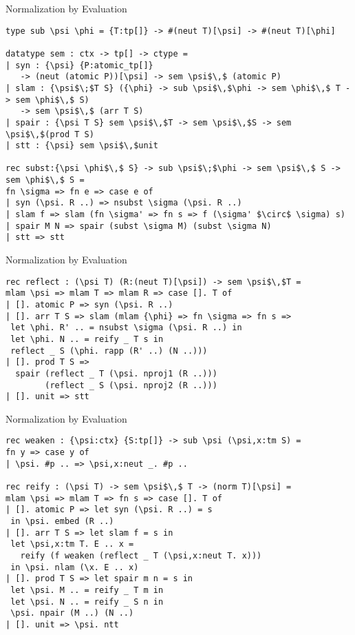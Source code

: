 \documentclass{beamer}
\begin{document}
\begin{frame}[fragile]{Normalization by Evaluation}

\begin{lstlisting}
type sub \psi \phi = {T:tp[]} -> #(neut T)[\psi] -> #(neut T)[\phi]

datatype sem : ctx -> tp[] -> ctype =
| syn : {\psi} {P:atomic_tp[]}
   -> (neut (atomic P))[\psi] -> sem \psi$\,$ (atomic P)
| slam : {\psi$\;$T S} ({\phi} -> sub \psi$\,$\phi -> sem \phi$\,$ T -> sem \phi$\,$ S)
   -> sem \psi$\,$ (arr T S)
| spair : {\psi T S} sem \psi$\,$T -> sem \psi$\,$S -> sem \psi$\,$(prod T S)
| stt : {\psi} sem \psi$\,$unit

rec subst:{\psi \phi$\,$ S} -> sub \psi$\;$\phi -> sem \psi$\,$ S -> sem \phi$\,$ S =
fn \sigma => fn e => case e of
| syn (\psi. R ..) => nsubst \sigma (\psi. R ..)
| slam f => slam (fn \sigma' => fn s => f (\sigma' $\circ$ \sigma) s)
| spair M N => spair (subst \sigma M) (subst \sigma N)
| stt => stt
\end{lstlisting}
\end{frame}

\begin{frame}[fragile]{Normalization by Evaluation}
\begin{lstlisting}
rec reflect : (\psi T) (R:(neut T)[\psi]) -> sem \psi$\,$T =
mlam \psi => mlam T => mlam R => case []. T of
| []. atomic P => syn (\psi. R ..) 
| []. arr T S => slam (mlam {\phi} => fn \sigma => fn s =>
 let \phi. R' .. = nsubst \sigma (\psi. R ..) in
 let \phi. N .. = reify _ T s in
 reflect _ S (\phi. rapp (R' ..) (N ..)))
| []. prod T S =>
  spair (reflect _ T (\psi. nproj1 (R ..)))
        (reflect _ S (\psi. nproj2 (R ..)))
| []. unit => stt
\end{lstlisting}
\end{frame}

\begin{frame}[fragile]{Normalization by Evaluation}
\begin{lstlisting}
rec weaken : {\psi:ctx} {S:tp[]} -> sub \psi (\psi,x:tm S) =
fn y => case y of
| \psi. #p .. => \psi,x:neut _. #p ..

rec reify : (\psi T) -> sem \psi$\,$ T -> (norm T)[\psi] = 
mlam \psi => mlam T => fn s => case []. T of 
| []. atomic P => let syn (\psi. R ..) = s
 in \psi. embed (R ..)
| []. arr T S => let slam f = s in
 let \psi,x:tm T. E .. x =  
   reify (f weaken (reflect _ T (\psi,x:neut T. x)))
 in \psi. nlam (\x. E .. x)
| []. prod T S => let spair m n = s in
 let \psi. M .. = reify _ T m in
 let \psi. N .. = reify _ S n in
 \psi. npair (M ..) (N ..)
| []. unit => \psi. ntt
\end{lstlisting}
\end{frame}
\end{document}
